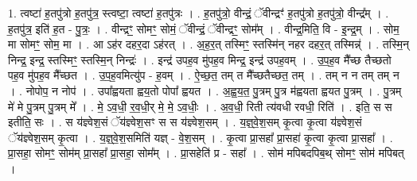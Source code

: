 \documentclass[17pt]{extarticle}
\begin{document}
1. त्वष्टा॑ ह॒तपु॑त्रो ह॒तपु॑त्र॒ स्त्वष्टा॒ त्वष्टा॑ ह॒तपु॑त्रः । . ह॒तपु॑त्रो॒ वीन्द्रं॒ ॅवीन्द्रꣳ॑ ह॒तपु॑त्रो ह॒तपु॑त्रो॒ वीन्द्र᳚म् । . ह॒तपु॑त्र॒ इति॑ ह॒त - पु॒त्रः॒ । . वीन्द्रꣳ॒॒ सोमꣳ॒॒ सोमं॒ ॅवीन्द्रं॒ ॅवीन्द्रꣳ॒॒ सोम᳚म् । . वीन्द्र॒मिति॒ वि - इ॒न्द्र॒म् । . सोम॒ मा सोमꣳ॒॒ सोम॒ मा । . आ ऽह॑र दहर॒दा ऽह॑रत् । . अ॒ह॒र॒त् तस्मिꣳ॒॒ स्तस्मि॑न् नहर दहर॒त् तस्मिन्न्॑ । . तस्मि॒न् निन्द्र॒ इन्द्र॒ स्तस्मिꣳ॒॒ स्तस्मि॒न् निन्द्रः॑ । . इन्द्र॑ उपह॒व मु॑पह॒व मिन्द्र॒ इन्द्र॑ उपह॒वम् । . उ॒प॒ह॒व मै᳚च्छ तैच्छतो पह॒व मु॑पह॒व मै᳚च्छत । . उ॒प॒ह॒वमित्यु॑प - ह॒वम् । . ऐ॒च्छ॒त॒ तम् त मै᳚च्छतैच्छत॒ तम् । . तम् न न तम् तम् न । . नोपोप॒ न नोप॑ । . उपा᳚ह्वयता ह्वय॒तो पोपा᳚ ह्वयत । . अ॒ह्व॒य॒त॒ पु॒त्रम् पु॒त्र म॑ह्वयता ह्वयत पु॒त्रम् । . पु॒त्रम् मे॑ मे पु॒त्रम् पु॒त्रम् मे᳚ । . मे॒ ऽव॒धी॒ र॒व॒धी॒र् मे॒ मे॒ ऽव॒धीः॒ । . अ॒व॒धी॒ रिती त्य॑वधी रवधी॒ रिति॑ । . इति॒ स स इतीति॒ सः । . स य॑ज्ञ्वेश॒सं ॅय॑ज्ञ्वेश॒सꣳ स स य॑ज्ञ्वेश॒सम् । . य॒ज्ञ्॒वे॒श॒सम् कृ॒त्वा कृ॒त्वा य॑ज्ञ्वेश॒सं ॅय॑ज्ञ्वेश॒सम् कृ॒त्वा । . य॒ज्ञ्॒वे॒श॒समिति॑ यज्ञ् - वे॒श॒सम् । . कृ॒त्वा प्रा॒सहा᳚ प्रा॒सहा॑ कृ॒त्वा कृ॒त्वा प्रा॒सहा᳚ । . प्रा॒सहा॒ सोमꣳ॒॒ सोम॑म् प्रा॒सहा᳚ प्रा॒सहा॒ सोम᳚म् । . प्रा॒सहेति॑ प्र - सहा᳚ । . सोम॑ मपिबदपिब॒थ् सोमꣳ॒॒ सोम॑ मपिबत् । \newline
\end{document}
